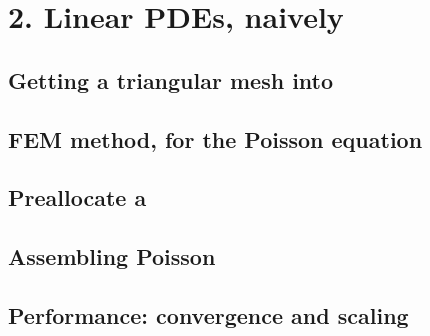 
\chapter{2. Linear PDEs, naively}

\section{Getting a triangular mesh into \PETSc}


\section{FEM method, for the Poisson equation}

\section{Preallocate a \pMat}


\section{Assembling Poisson}

\section{Performance: convergence and scaling}

